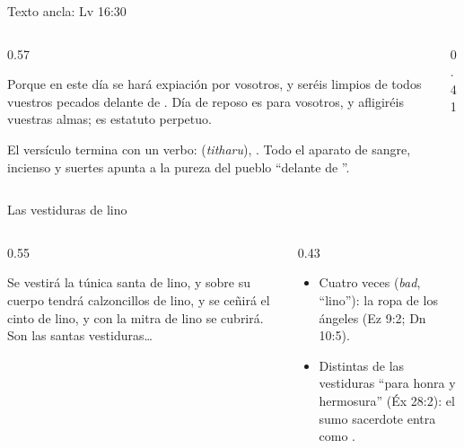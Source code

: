 \begin{frame}{Texto ancla: Lv 16:30}
\begin{columns}[c,onlytextwidth]
\begin{column}{0.57\textwidth}
\begin{cita}Porque en este día se hará expiación por vosotros, y seréis limpios de todos vuestros pecados delante de \SENOR. Día de reposo es para vosotros, y afligiréis vuestras almas; es estatuto perpetuo.\end{cita}
\small El versículo termina con un verbo:  (\emph{titharu}), . Todo el aparato de sangre, incienso y suertes apunta a la pureza del pueblo ``delante de \SENOR''.
\end{column}
\begin{column}{0.41\textwidth}\end{column}
\end{columns}
\end{frame}

\begin{frame}{Las vestiduras de lino}
\begin{columns}[c,onlytextwidth]
\begin{column}{0.55\textwidth}
\begin{cita}Se vestirá la túnica santa de lino, y sobre su cuerpo tendrá calzoncillos de lino, y se ceñirá el cinto de lino, y con la mitra de lino se cubrirá. Son las santas vestiduras\ldots{}\end{cita}
\end{column}
\begin{column}{0.43\textwidth}\small
\begin{itemize}
\item Cuatro veces  (\emph{bad}, ``lino''): la ropa de los ángeles (Ez 9:2; Dn 10:5).
\item Distintas de las vestiduras ``para honra y hermosura'' (Éx 28:2): el sumo sacerdote entra como .
\end{itemize}
\end{column}
\end{columns}
\end{frame}

